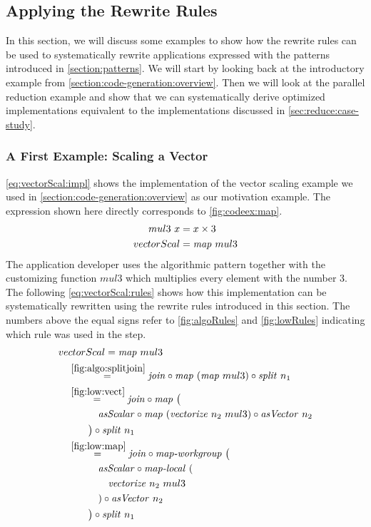 \subsection{Applying the Rewrite Rules}
\label{sec:example}
\label{sec:applying:rules}
In this section, we will discuss some examples to show how the rewrite rules can be used to systematically rewrite applications expressed with the patterns introduced in \autoref{section:patterns}.
We will start by looking back at the introductory example from \autoref{section:code-generation:overview}.
Then we will look at the parallel reduction example and show that we can systematically derive optimized implementations equivalent to the implementations discussed in \autoref{sec:reduce:case-study}.

\subsubsection{A First Example: Scaling a Vector}
\autoref{eq:vectorScal:impl} shows the implementation of the vector scaling example we used in \autoref{section:code-generation:overview} as our motivation example.
The expression shown here directly corresponds to \autoref{fig:codeex:map}.
\begin{align}
  mul3\ x &= x \times 3\nonumber\\
  vectorScal &= \text{\textit{map}}\ mul3
  \label{eq:vectorScal:impl}
\end{align}
The application developer uses the algorithmic pattern \map together with the customizing function $mul3$ which multiplies every element with the number $3$.
The following \autoref{eq:vectorScal:rules} shows how this implementation can be systematically rewritten using the rewrite rules introduced in this section.
The numbers above the equal signs refer to \autoref{fig:algoRules} and \autoref{fig:lowRules} indicating which rule was used in the step.
\begin{align}
  &vectorScal = \text{\textit{map}}\ mul3\nonumber\\
  &\quad\begin{aligned}
    &\overset{\ref{fig:algo:splitjoin}}{=\hspace{.2em}}
      \text{\textit{join}} \circ \text{\textit{map}}\ (\text{\textit{map}}\ mul3) \circ \text{\textit{split}}\ n_1\\
    &\overset{\ref{fig:low:vect}}{=\hspace{.2em}}
      \text{\textit{join}} \circ \text{\textit{map}}\ \big(\\
      &\qquad\quad \text{\textit{asScalar}} \circ \text{\textit{map}}\ (\text{\textit{vectorize}}\ n_2\ mul3) \circ \text{\textit{asVector}}\ n_2\\
      &\qquad\big) \circ \text{\textit{split}}\ n_1\\
    &\overset{\ref{fig:low:map}}{=\hspace{.2em}}
      \text{\textit{join}} \circ \text{\textit{map-workgroup}}\ \big(\\
      &\qquad\quad \text{\textit{asScalar}} \circ \text{\textit{map-local}}\ (\\
      &\qquad\qquad\text{\textit{vectorize}}\ n_2\ mul3\\
      &\qquad\quad) \circ \text{\textit{asVector}}\ n_2\\
      &\qquad\big) \circ \text{\textit{split}}\ n_1
  \end{aligned}
  \label{eq:vectorScal:rules}
\end{align}
